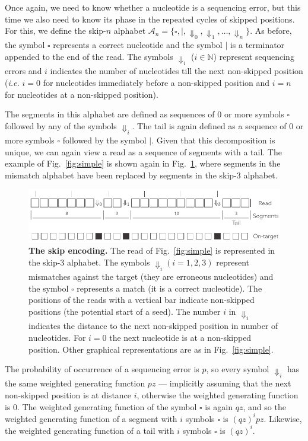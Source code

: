 \documentclass{article}
\begin{document}
Once again, we need to know whether a nucleotide is a sequencing error,
but this time we also need to know its phase in the repeated cycles of
skipped positions. For this, we define the skip-$n$ alphabet
$\mathcal{A}_n = \{\square, |, \Downarrow_0, \Downarrow_1, \ldots,
\Downarrow_n \}$. As before, the symbol $\square$ represents a correct
nucleotide and the symbol $|$ is a terminator appended to the end of the
read. The symbols $\Downarrow_i$ ($i \in \mathbb{N}$) represent sequencing
errors and $i$ indicates the number of nucleotides till the next
non-skipped position (\textit{i.e.} $i=0$ for nucleotides immediately
before a non-skipped position and $i=n$ for nucleotides at a non-skipped
position).

The segments in this alphabet are defined as sequences of 0 or more
symbols $\square$ followed by any of the symbols $\Downarrow_i$. The tail
is again defined as a sequence of 0 or more symbols $\square$ followed by
the symbol $|$. Given that this decomposition is unique, we can again view
a read as a sequence of segments with a tail. The example of
Fig.~\ref{fig:simple} is shown again in Fig.~\ref{fig:skip}, where
segments in the mismatch alphabet have been replaced by segments in the
skip-3 alphabet.

\begin{figure}[h]
\centering
\includegraphics[scale=0.85]{sketch_skip.pdf}
\caption{\textbf{The skip encoding.}
The read of Fig.~\ref{fig:simple} is represented in the skip-3 alphabet.
The symbols $\Downarrow_i (i = 1,2,3)$ represent mismatches against the
target (they are erroneous nucleotides) and the symbol $\square$
represents a match (it is a correct nucleotide). The positions of the
reads with a vertical bar indicate non-skipped positions (the potential
start of a seed). The number $i$ in $\Downarrow_i$ indicates the distance
to the next non-skipped position in number of nucleotides. For $i=0$ the
next nucleotide is at a non-skipped position. Other graphical
representations are as in Fig.~\ref{fig:simple}.}
\label{fig:skip}
\end{figure}

The probability of occurrence of a sequencing error is $p$, so every
symbol $\Downarrow_i$ has the same weighted generating function $pz$ ---
implicitly assuming that the next non-skipped position is at distance $i$,
otherwise the weighted generating function is 0. The weighted generating
function of the symbol $\square$ is again $qz$, and so the weighted
generating function of a segment with $i$ symbols $\square$ is $(qz)^ipz$.
Likewise, the weighted generating function of a tail with $i$ symbols
$\square$ is $(qz)^i$.
\end{document}
